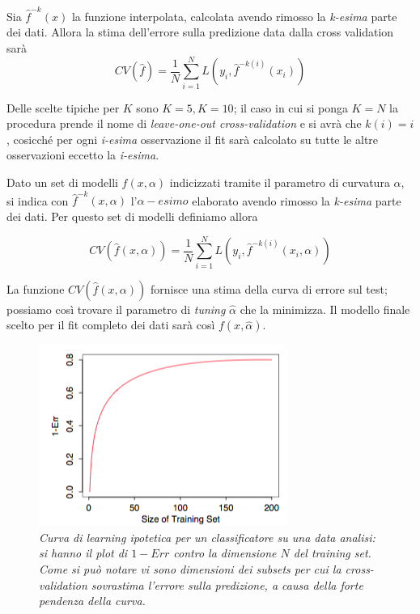 \documentclass[12pt,openright,twoside,a4paper]{book}
\begin{document}
Sia $\hat{f}^{-k}(x)$ la funzione interpolata, calcolata avendo rimosso la \textit{k-esima} parte dei dati.
Allora la stima dell'errore sulla predizione data dalla cross validation sarà
\begin{equation}
CV(\hat{f})=\frac{1}{N}\sum^{N}_{i=1}L(y_i,\hat{f}^{-k(i)}(x_i))
\end{equation}

Delle scelte tipiche per $K$ sono $K=5,K=10$; il caso in cui si ponga $K=N$ la procedura prende il nome di \textit{leave-one-out cross-validation} e si avrà che $k(i)=i$, cosicché per ogni \textit{i-esima} osservazione il fit sarà calcolato su tutte le altre osservazioni eccetto la \textit{i-esima}.

Dato un set di modelli $f(x,\alpha)$ indicizzati tramite il parametro di curvatura $\alpha$, si indica con $\hat{f}^{-k}(x,\alpha)$ l'$\alpha-esimo$ elaborato avendo rimosso la \textit{k-esima} parte dei dati.
Per questo set di modelli definiamo allora

\begin{equation}
CV(\hat{f}(x,\alpha))=\frac{1}{N}\sum^{N}_{i=1}L(y_i,\hat{f}^{-k(i)}(x_i,\alpha))
\end{equation}

La funzione $CV(\hat{f}(x,\alpha))$ fornisce una stima della curva di errore sul test; possiamo così trovare il parametro di \textit{tuning} $\hat{\alpha}$ che la minimizza. Il modello finale scelto per il fit completo dei dati sarà così $f(x,\hat{\alpha})$. \cite{ESL}

\begin{figure}[!h]
\centering
\includegraphics[width=0.5\linewidth]{LearningCurve}
\caption{\textit{Curva di learning ipotetica per un classificatore su una data analisi: si hanno il plot di $1-Err$ contro la dimensione $N$ del training set. Come si può notare vi sono dimensioni dei subsets per cui la cross-validation sovrastima l'errore sulla predizione, a causa della forte pendenza della curva. }}
\label{curve}
\end{figure}
\end{document}
